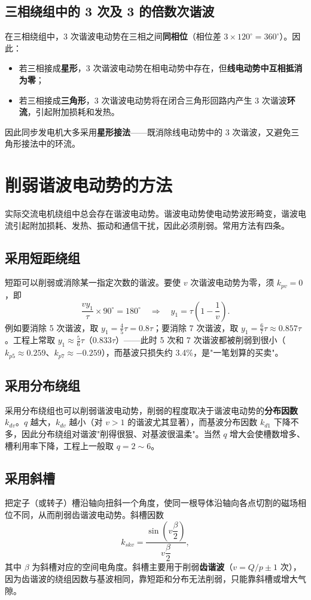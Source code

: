 \subsection{三相绕组中的 3 次及 3 的倍数次谐波}
在三相绕组中，3 次谐波电动势在三相之间\textbf{同相位}（相位差 $3\times120^\circ=360^\circ$）。因此：
\begin{itemize}
  \item 若三相接成\textbf{星形}，3 次谐波电动势在相电动势中存在，但\textbf{线电动势中互相抵消为零}；
  \item 若三相接成\textbf{三角形}，3 次谐波电动势将在闭合三角形回路内产生 3 次谐波\textbf{环流}，引起附加损耗和发热。
\end{itemize}
因此同步发电机大多采用\textbf{星形接法}——既消除线电动势中的 3 次谐波，又避免三角形接法中的环流。

\section{削弱谐波电动势的方法}

实际交流电机绕组中总会存在谐波电动势。谐波电动势使电动势波形畸变，谐波电流引起附加损耗、发热、振动和通信干扰，因此必须削弱。常用方法有四条。

\subsection{采用短距绕组}
短距可以削弱或消除某一指定次数的谐波。要使 $v$ 次谐波电动势为零，须 $k_{pv}=0$，即
\begin{equation}
\frac{vy_1}{\tau}\times90^\circ=180^\circ
\quad\Longrightarrow\quad
y_1=\tau\left(1-\frac1v\right).
\end{equation}
例如要消除 5 次谐波，取 $y_1=\tfrac45\tau=0.8\tau$；要消除 7 次谐波，取 $y_1=\tfrac67\tau\approx0.857\tau$。工程上常取 $y_1\approx\tfrac56\tau$（$0.833\tau$）——此时 5 次和 7 次谐波都被削弱到很小（$k_{p5}\approx0.259$、$k_{p7}\approx-0.259$），而基波只损失约 3.4\%，是"一笔划算的买卖"。

\subsection{采用分布绕组}
采用分布绕组也可以削弱谐波电动势，削弱的程度取决于谐波电动势的\textbf{分布因数} $k_{dv}$。$q$ 越大，$k_{dv}$ 越小（对 $v>1$ 的谐波尤其显著），而基波分布因数 $k_{d1}$ 下降不多，因此分布绕组对谐波"削得很狠、对基波很温柔"。当然 $q$ 增大会使槽数增多、槽利用率下降，工程上一般取 $q=2\sim6$。

\subsection{采用斜槽}
把定子（或转子）槽沿轴向扭斜一个角度，使同一根导体沿轴向各点切割的磁场相位不同，从而削弱齿谐波电动势。斜槽因数
\begin{equation}
k_{skv}=\frac{\sin\left(v\dfrac{\beta}{2}\right)}{v\dfrac{\beta}{2}},
\end{equation}
其中 $\beta$ 为斜槽对应的空间电角度。斜槽主要用于削弱\textbf{齿谐波}（$v=Q/p\pm1$ 次），因为齿谐波的绕组因数与基波相同，靠短距和分布无法削弱，只能靠斜槽或增大气隙。

